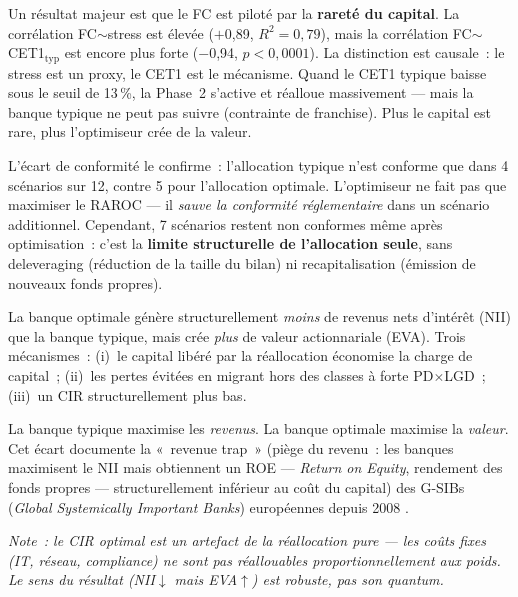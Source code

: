 \documentclass[10pt, a4paper, oneside]{report}
\theoremstyle{definition}
\begin{document}
Un résultat majeur est que le FC est piloté par la \textbf{rareté du capital}. La corrélation FC$\sim$stress est élevée ($+$0{,}89, $R^2 = 0{,}79$), mais la corrélation FC$\sim$CET1$_{\text{typ}}$ est encore plus forte ($-$0{,}94, $p < 0{,}0001$). La distinction est causale~: le stress est un proxy, le CET1 est le mécanisme. Quand le CET1 typique baisse sous le seuil de 13\,\%, la Phase~2 s'active et réalloue massivement --- mais la banque typique ne peut pas suivre (contrainte de franchise). Plus le capital est rare, plus l'optimiseur crée de la valeur.

L'écart de conformité le confirme~: l'allocation typique n'est conforme que dans 4 scénarios sur 12, contre 5 pour l'allocation optimale. L'optimiseur ne fait pas que maximiser le RAROC --- il \emph{sauve la conformité réglementaire} dans un scénario additionnel. Cependant, 7 scénarios restent non conformes même après optimisation~: c'est la \textbf{limite structurelle de l'allocation seule}, sans deleveraging (réduction de la taille du bilan) ni recapitalisation (émission de nouveaux fonds propres).

\begin{tcolorbox}[colback=bleutitre!3, colframe=bleutitre!50, title=\small\textbf{Le paradoxe NII}]
\small
La banque optimale génère structurellement \emph{moins} de revenus nets d'intérêt (NII) que la banque typique, mais crée \emph{plus} de valeur actionnariale (EVA). Trois mécanismes~: (i)~le capital libéré par la réallocation économise la charge de capital~; (ii)~les pertes évitées en migrant hors des classes à forte PD$\times$LGD~; (iii)~un CIR structurellement plus bas.

\medskip
La banque typique maximise les \emph{revenus}. La banque optimale maximise la \emph{valeur}. Cet écart documente la «~revenue trap~» (piège du revenu~: les banques maximisent le NII mais obtiennent un ROE --- \emph{Return on Equity}, rendement des fonds propres --- structurellement inférieur au coût du capital) des G-SIBs (\emph{Global Systemically Important Banks}) européennes depuis 2008 \citep{ecb_fsr2023}.

\medskip
\footnotesize\emph{Note~: le CIR optimal est un artefact de la réallocation pure --- les coûts fixes (IT, réseau, compliance) ne sont pas réallouables proportionnellement aux poids. Le sens du résultat (NII$\downarrow$ mais EVA$\uparrow$) est robuste, pas son quantum.}
\end{tcolorbox}
\end{document}
